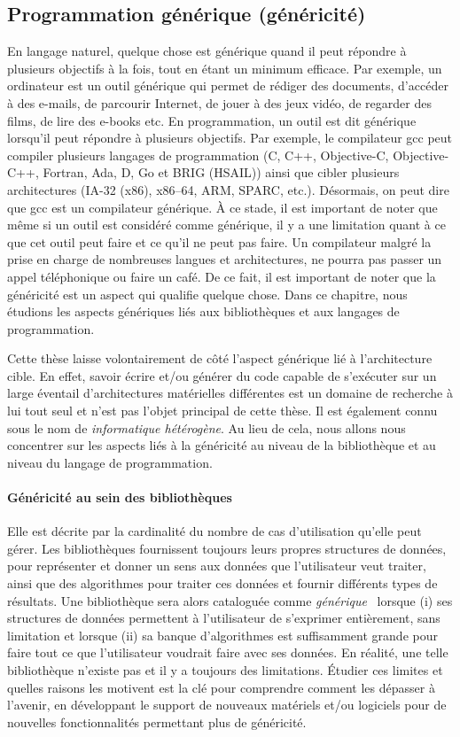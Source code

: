 \subsection*{Programmation générique (généricité)}


En langage naturel, quelque chose est générique quand il peut répondre à plusieurs objectifs à la fois, tout en étant un
minimum efficace. Par exemple, un ordinateur est un outil générique qui permet de rédiger des documents, d'accéder à des
e-mails, de parcourir Internet, de jouer à des jeux vidéo, de regarder des films, de lire des e-books etc. En
programmation, un outil est dit générique lorsqu'il peut répondre à plusieurs objectifs. Par exemple, le compilateur gcc
peut compiler plusieurs langages de programmation (C, C++, Objective-C, Objective-C++, Fortran, Ada, D, Go et BRIG
(HSAIL)) ainsi que cibler plusieurs architectures (IA-32 (x86), x86--64, ARM, SPARC, etc.). Désormais, on peut dire que
gcc est un compilateur générique. À ce stade, il est important de noter que même si un outil est considéré comme
générique, il y a une limitation quant à ce que cet outil peut faire et ce qu'il ne peut pas faire. Un compilateur
malgré la prise en charge de nombreuses langues et architectures, ne pourra pas passer un appel téléphonique ou faire un
café. De ce fait, il est important de noter que la généricité est un aspect qui qualifie quelque chose. Dans ce
chapitre, nous étudions les aspects génériques liés aux bibliothèques et aux langages de programmation.

Cette thèse laisse volontairement de côté l'aspect générique lié à l'architecture cible. En effet, savoir écrire et/ou
générer du code capable de s'exécuter sur un large éventail d'architectures matérielles différentes est un domaine de
recherche à lui tout seul et n'est pas l'objet principal de cette thèse. Il est également connu sous le nom de
\emph{informatique hétérogène}. Au lieu de cela, nous allons nous concentrer sur les aspects liés à la généricité au
niveau de la bibliothèque et au niveau du langage de programmation.

\paragraph{Généricité au sein des bibliothèques} Elle est décrite par la cardinalité du nombre de cas d'utilisation
qu'elle peut gérer. Les bibliothèques fournissent toujours leurs propres structures de données, pour représenter et
donner un sens aux données que l'utilisateur veut traiter, ainsi que des algorithmes pour traiter ces données et fournir
différents types de résultats. Une bibliothèque sera alors cataloguée comme
\emph{générique}~\parencite{musser.1994.algorithm} lorsque (i) ses structures de données permettent à l'utilisateur de
s'exprimer entièrement, sans limitation et lorsque (ii) sa banque d'algorithmes est suffisamment grande pour faire tout
ce que l'utilisateur voudrait faire avec ses données. En réalité, une telle bibliothèque n'existe pas et il y a toujours
des limitations. Étudier ces limites et quelles raisons les motivent est la clé pour comprendre comment les dépasser à
l'avenir, en développant le support de nouveaux matériels et/ou logiciels pour de nouvelles fonctionnalités permettant
plus de généricité.

